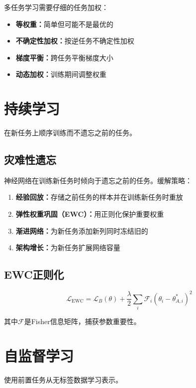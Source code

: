 多任务学习需要仔细的任务加权：
\begin{itemize}
    \item \textbf{等权重：}简单但可能不是最优的
    \item \textbf{不确定性加权：}按逆任务不确定性加权 \cite{kendall2018multi}
    \item \textbf{梯度平衡：}跨任务平衡梯度大小
    \item \textbf{动态加权：}训练期间调整权重
\end{itemize}

\section{持续学习}

在新任务上顺序训练而不遗忘之前的任务。

\subsection{灾难性遗忘}

神经网络在训练新任务时倾向于遗忘之前的任务。缓解策略：

\begin{enumerate}
    \item \textbf{经验回放：}存储之前任务的样本并在训练新任务时重放
    \item \textbf{弹性权重巩固（EWC）：}用正则化保护重要权重 \cite{kirkpatrick2017overcoming}
    \item \textbf{渐进网络：}为新任务添加新列同时冻结旧的
    \item \textbf{架构增长：}为新任务扩展网络容量
\end{enumerate}

\subsection{EWC正则化}

\begin{equation}
\mathcal{L}_{\text{EWC}} = \mathcal{L}_B(\theta) + \frac{\lambda}{2}\sum_i \mathcal{F}_i (\theta_i - \theta_{A,i}^*)^2
\end{equation}

其中$\mathcal{F}$是Fisher信息矩阵，捕获参数重要性。

\section{自监督学习}

使用前置任务从无标签数据学习表示。

